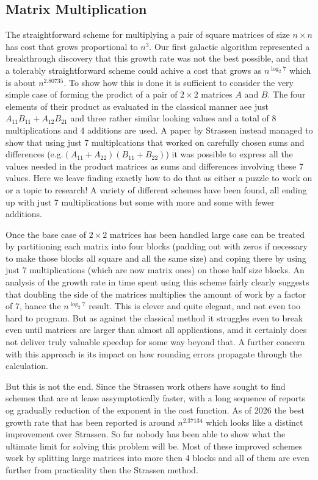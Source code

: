 \subsection{Matrix Multiplication}
The straightforward scheme for multiplying a pair of square matrices of
size $n \times n$ has cost that grows proportional to $n^{3}$. Our first
galactic algorithm represented a breakthrough discovery that this
growth rate was not the best possible, and that a tolerably straightforward
scheme could achive a cost that grows as $n^{\log_{2} 7}$ which is
about $n^{2.80735}$. To show how this is done it is sufficient to
consider the very simple case of forming the prodict of a pair of $2 \times 2$
matrices $A$ and $B$. The four elements of their product as evaluated
in the classical manner aee just $A_{11} B_{11} + A_{12} B_{21}$ and three
rather similar looking values and a total of 8 multiplications and 4
additions are used. A paper by Strassen\cite{strassen} instead managed to
show that using just 7 multiplcations that worked on carefully chosen sums
and differences (e.g.$(A_{11} + A_{22})(B_{11} + B_{22})$) it was possible
to express all the values needed in the product matrices as sums and
differences involving these 7 values. Here we leave finding exactly how
to do that as either a puzzle to work on or a topic to research! A variety
of different schemes have been found, all ending up with just 7
multiplications but some with more and some with fewer additions.

Once the base case of $2 \times 2$ matrices has been handled large case can
be treated by partitioning each matrix into four blocks (padding out with
zeros if necessary to make those blocks all square and all the same size)
and coping there by using just 7 multiplications (which are now matrix ones)
on those half size blocks. An analysis of the growth rate in time spent
using this scheme fairly clearly suggests that doubling the side of
the matrices multiplies the amount of work by a factor of 7, hance the
$n^{\log_{2} 7}$ result. This is clever and quite elegant, and not even
too hard to program. But as against the classical method it struggles
even to break even until matrices are larger than almost all applications,
amd it certainly does not deliver truly valuable speedup for some way
beyond that. A further concern with this approach is its impact on how
rounding errors propagate through the calculation.

But this is not the end. Since the Strassen work others have sought
to find schemes that are at lease assymptotically faster, with a long
sequence of reports og gradually reduction of the exponent in the
cost function. As of 2026 the best growth rate that has been reported is
around $n^{2.37134}$ which looks like a distinct improvement over
Strassen. So far nobody has been able to show what the ultimate limit
for solving this problem will be. Most of these improved schemes work
by splitting large matrices into more then 4 blocks and all of them
are even further from practicality then the Strassen method.

